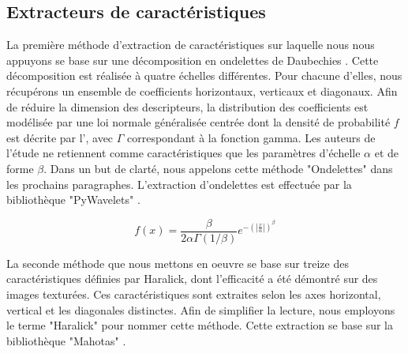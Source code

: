 \documentclass{gretsi}
\begin{document}
\begin{sloppypar}
\subsection{Extracteurs de caractéristiques}
La première méthode d'extraction de caractéristiques sur laquelle nous nous appuyons se base sur une décomposition en ondelettes de Daubechies \cite{Halimi2017a}. Cette décomposition est réalisée à quatre échelles différentes. Pour chacune d'elles, nous récupérons un ensemble de coefficients horizontaux, verticaux et diagonaux. Afin de réduire la dimension des descripteurs, la distribution des coefficients est modélisée par une loi normale généralisée centrée dont la densité de probabilité $f$ est décrite par l', avec $\Gamma$ correspondant à la fonction gamma. Les auteurs de l'étude ne retiennent comme caractéristiques que les paramètres d'échelle $\alpha$ et de forme $\beta$. Dans un but de clarté, nous appelons cette méthode "Ondelettes" dans les prochains paragraphes. L'extraction d'ondelettes est effectuée par la bibliothèque "PyWavelets" \cite{lee2006pywavelets}.\par

\begin{equation}
    f(x)= \frac{\beta}{2\alpha\Gamma(1/\beta)} e^{-\left(|\frac{x}{\alpha}|\right)^\beta}
    \label{ggd}
\end{equation}

La seconde méthode que nous mettons en oeuvre se base sur treize des caractéristiques définies par Haralick, dont l'efficacité a été démontré sur des images texturées. Ces caractéristiques sont extraites selon les axes horizontal, vertical et les diagonales distinctes. Afin de simplifier la lecture, nous employons le terme "Haralick" pour nommer cette méthode. Cette extraction se base sur la bibliothèque "Mahotas" \cite{coelho2012mahotas}.\par


\end{sloppypar}
\end{document}
